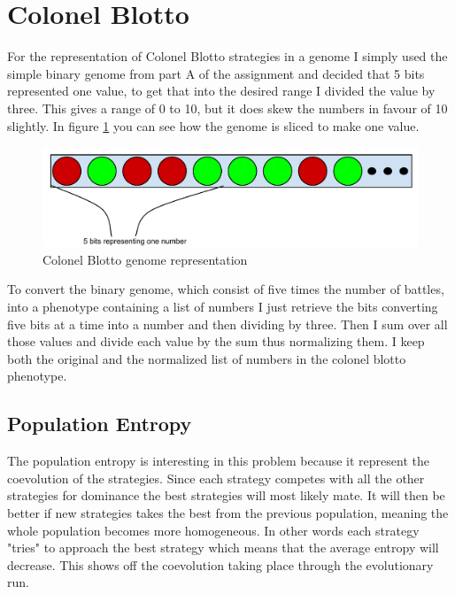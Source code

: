 \section{Colonel Blotto}\label{sec:colonel blotto}
For the representation of Colonel Blotto strategies in a genome I simply used
the simple binary genome from part A of the assignment and decided that 5 bits
represented one value, to get that into the desired range I divided the value by
three. This gives a range of 0 to 10, but it does skew the numbers in favour of
10 slightly. In figure \ref{fig:colonel blotto genome} you can see how the
genome is sliced to make one value.

\begin{figure}[h!]
	\centering
	\includegraphics[scale=0.5]{blotto-genome.pdf}
	\caption{Colonel Blotto genome representation}
	\label{fig:colonel blotto genome}
\end{figure}

To convert the binary genome, which consist of five times the number of battles,
into a phenotype containing a list of numbers I just retrieve the bits
converting five bits at a time into a number and then dividing by three. Then I
sum over all those values and divide each value by the sum thus normalizing
them. I keep both the original and the normalized list of numbers in the colonel
blotto phenotype.

\subsection{Population Entropy}\label{sec:population entropy}
The population entropy is interesting in this problem because it represent the
coevolution of the strategies. Since each strategy competes with all the other
strategies for dominance the best strategies will most likely mate. It will then
be better if new strategies takes the best from the previous population, meaning
the whole population becomes more homogeneous. In other words each strategy
"tries" to approach the best strategy which means that the average entropy will
decrease. This shows off the coevolution taking place through the evolutionary
run.

